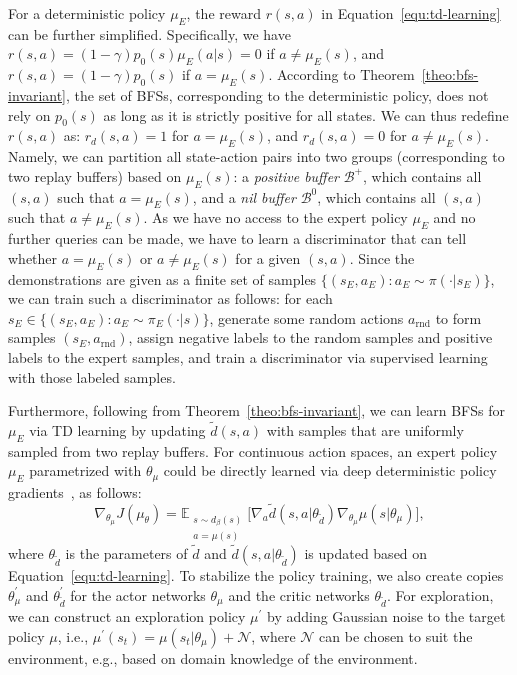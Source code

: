 \documentclass[letterpaper]{article} %
\begin{document}
For a deterministic policy $\mu_E$, the reward $r(s, a)$ in Equation~\eqref{equ:td-learning} can be further simplified. 
Specifically, we have $r(s, a) = (1-\gamma) p_0(s)\mu_E(a|s) = 0$ if $a\neq\mu_E(s)$, 
and $r(s, a)= (1-\gamma) p_0(s)$ if $a=\mu_E(s)$.
According to Theorem~\ref{theo:bfs-invariant}, 
the set of BFSs, corresponding to the deterministic policy, 
does not rely on $p_0(s)$ as long as it is strictly positive for all states.
We can thus redefine $r(s, a)$  as: 
$r_d(s, a) = 1$ for $a=\mu_E(s)$, and $r_d(s, a)=0$ for $a\neq\mu_E(s)$. 
Namely, we can partition all state-action pairs into two groups (corresponding to two replay buffers) based on $\mu_E(s)$: 
a \textit{positive buffer} $\mathcal{B}^{+}$, which contains all $(s, a)$ such that $a=\mu_E(s)$, 
and a \textit{nil buffer} $\mathcal{B}^{0}$, which contains all $(s, a)$ such that $a\neq\mu_E(s)$. 
As we have no access to the expert policy $\mu_E$ and no further queries can be made, 
we have to learn a discriminator that can tell whether $a=\mu_E(s)$ or $a\neq\mu_E(s)$ for a given $(s, a)$. 
Since the demonstrations are given as a finite set of samples $\{(s_E, a_E): a_E\sim\pi(\cdot|s_E)\}$, 
we can  train such a discriminator as follows:
for each $s_E \in \{(s_E, a_E): a_E\sim\pi_E(\cdot|s)\}$, generate some random actions $a_{\text{rnd}}$ to form samples $(s_E, a_{\text{rnd}})$, 
assign negative labels to the random samples and positive labels to the expert samples, 
and train a discriminator via supervised learning with those labeled samples. 



Furthermore, following from Theorem~\ref{theo:bfs-invariant}, 
we can learn BFSs for $\mu_E$ via TD learning by updating $\tilde{d}(s, a)$ with samples that are uniformly sampled from two replay buffers. 
For continuous action spaces, an expert policy $\mu_{E}$ parametrized with $\theta_{\mu}$ could be directly learned via deep deterministic policy gradients~\cite{lillicrap2015continuous},
as follows: 
\begin{equation}\label{equ:deterministic-update}
\nabla_{\theta_\mu}J(\mu_{\theta}) = \mathbb{E}_{\substack{s\sim d_{\beta}(s) \\a=\mu(s)}}\big[ \nabla_a \tilde{d}(s, a|\theta_{\tilde{d}})\nabla_{\theta_\mu}\mu(s|\theta_\mu)  \big],
\end{equation}
where $\theta_{\tilde{d}}$ is the parameters of $\tilde{d}$ and $\tilde{d}(s, a|\theta_{\tilde{d}})$ is updated based on Equation~\eqref{equ:td-learning}.
To stabilize the policy training, we also create copies $\theta_\mu^\prime$ and $\theta_{\tilde{d}}^\prime$ for the actor networks $\theta_{\mu}$ and the critic networks $\theta_{\tilde{d}}$.
For exploration, we can construct an exploration policy $\mu^\prime$ by adding Gaussian noise to the target policy $\mu$, 
i.e., $\mu^\prime(s_t) = \mu(s_t|\theta_\mu) + \mathcal{N}$, 
where $\mathcal{N}$ can be chosen to suit the environment,
e.g., based on domain knowledge of the environment. 
\end{document}
